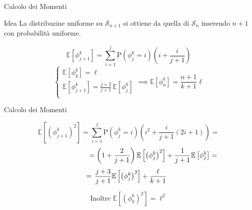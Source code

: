 \documentclass{beamer}
\begin{document}
\begin{frame}{Calcolo dei Momenti}
	\begin{block}{Idea}
		La distribuzine uniforme su $\mathcal{S}_{n+1}$ si ottiene da quella di $\mathcal{S}_n$ inserendo $n+1$ con probabilità uniforme.
	\end{block}
	\begin{equation*}
		\mathbb{E}\left[\phi_{j+1}^k\right] = \sum_{i=1}^j \mathrm{P}\left(\phi_j^k = i\right) \left(i + \frac{i}{j+1}\right)
	\end{equation*}
	\vspace{4mm}
	\pause
	$$ \begin{cases}
		\mathbb{E}\left[\phi_k^k\right] = \ell  \\
		 \mathbb{E}\left[\phi_{j+1}^k\right] = \frac{j + 2}{j + 1}\,\mathbb{E}\left[\phi_j^k\right]  \\
	\end{cases} \implies \mathbb{E}\left[\phi_n^k\right]  = \frac{n+1}{k+1}\ell $$



\end{frame}

\begin{frame}{Calcolo dei Momenti}
	\begin{allign*}
	\begin{equation*}
		\mathbb{E}\left[\left({\phi_{j+1}^k}\right)^2\right] = \sum_{i=1}^j \mathrm{P}\left(\phi_j^k = i\right) \left(i^2 + \frac{i}{j+1}\left(2i + 1\right)\right) =
	\end{equation*}
	\begin{equation*}
		\hspace{2.5cm}= \left(1 + \frac{2}{j + 1}\right)\mathbb{E}\left[\left({\phi_j^k}\right)^2\right] + \frac{1}{j + 1} \mathbb{E}\left[\phi_j^k\right] =
	\end{equation*}
	\begin{equation*}
		\hspace{-0.2cm} = \, \frac{j + 3}{j + 1}\mathbb{E}\left[\left({\phi_j^k}\right)^2\right] + \frac{\ell}{k + 1}
	\end{equation*}
	\end{allign*}

	\vspace{4mm}
	$$ \text{Inoltre } \mathbb{E}\left[\left({\phi_k^k}\right)^2\right] = \ell^2 $$

\end{frame}
\end{document}
